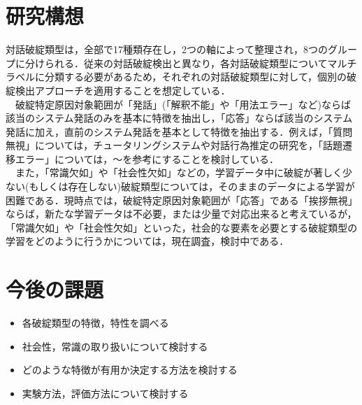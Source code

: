 \documentclass[upLaTex, 10pt,dvipdfmx,a4paper,twocolumn]{jsarticle}
\begin{document}
\section{研究構想}
    対話破綻類型は，全部で17種類存在し，2つの軸によって整理され，8つのグループに分けられる．従来の対話破綻検出と異なり，各対話破綻類型についてマルチラベルに分類する必要があるため，それぞれの対話破綻類型に対して，個別の破綻検出アプローチを適用することを想定している．\\
    　破綻特定原因対象範囲が「発話」(「解釈不能」や「用法エラー」など)ならば該当のシステム発話のみを基本に特徴を抽出し，「応答」ならば該当のシステム発話に加え，直前のシステム発話を基本として特徴を抽出する．例えば，「質問無視」については，チュータリングシステムや対話行為推定の研究を，「話題遷移エラー」については，～を参考にすることを検討している．\\  
    　また，「常識欠如」や「社会性欠如」などの，学習データ中に破綻が著しく少ない(もしくは存在しない)破綻類型については，そのままのデータによる学習が困難である．現時点では，破綻特定原因対象範囲が「応答」である「挨拶無視」ならば，新たな学習データは不必要，または少量で対応出来ると考えているが，「常識欠如」や「社会性欠如」といった，社会的な要素を必要とする破綻類型の学習をどのように行うかについては，現在調査，検討中である．

\section{今後の課題}
 \begin{itemize}
     \item 各破綻類型の特徴，特性を調べる
     \item 社会性，常識の取り扱いについて検討する
     \item どのような特徴が有用か決定する方法を検討する
     \item 実験方法，評価方法について検討する
 \end{itemize} 

 
 
\end{document}
